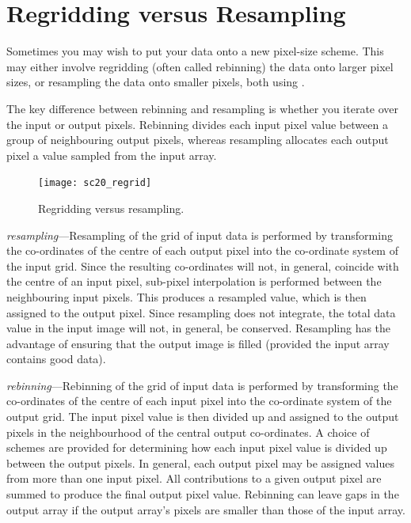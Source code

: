 \documentclass[11pt,oneside,chapters]{starlink}
\begin{document}
\chapter{Regridding versus Resampling}
\label{app:regrid}

Sometimes you may wish to put your data onto a new pixel-size scheme.
This may either involve regridding (often called rebinning) the data
onto larger pixel sizes, or resampling the data onto smaller pixels,
both using \Kappa.

The key difference between rebinning and resampling is whether you
iterate over the input or output pixels.  Rebinning divides each input
pixel value between a group of neighbouring output pixels, whereas
resampling allocates each output pixel a value sampled from the input
array.

\begin{figure}[h!]
\begin{center}
\texttt{[image: sc20\_regrid]}
\caption{\label{fig:regrid}
  Regridding versus resampling.}
\end{center}
\end{figure}

\emph{resampling}---Resampling of the grid of input data is performed
by transforming the co-ordinates of the centre of each output pixel
into the co-ordinate system of the input grid. Since the resulting
co-ordinates will not, in general, coincide with the centre of an
input pixel, sub-pixel interpolation is performed between the
neighbouring input pixels. This produces a resampled value, which is
then assigned to the output pixel.  Since resampling does not
integrate, the total data value in the input image will not, in
general, be conserved.  Resampling has the advantage of ensuring that
the output image is filled (provided the input array contains good
data).


\emph{rebinning}---Rebinning of the grid of input data is performed by
transforming the co-ordinates of the centre of each input pixel
into the co-ordinate system of the output grid.
The input pixel value is then divided up and assigned to the
output pixels in the neighbourhood of the central output
co-ordinates. A choice of schemes are provided for determining
how each input pixel value is divided up between the output
pixels. In general, each output pixel may be assigned values
from more than one input pixel. All contributions to a given
output pixel are summed to produce the final output pixel value.
Rebinning can leave gaps in the output array if the output
array's pixels are smaller than those of the input array.
\end{document}
